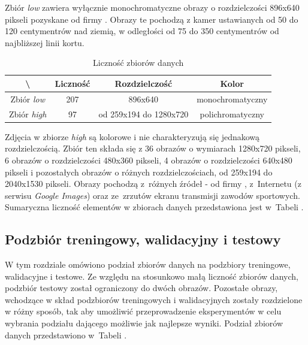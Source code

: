 Zbiór \textit{low} zawiera wyłącznie monochromatyczne obrazy o rozdzielczości 896x640 pikseli pozyskane od firmy \blue{}. Obrazy te pochodzą z kamer ustawianych od 50 do 120 centymentrów nad ziemią, w odległości od 75 do 350 centymentrów od najbliższej linii kortu.

\begin{table}[!h]
	\centering
	\caption{Liczność zbiorów danych}
	\vspace{6pt}
	{\footnotesize
		\begin{tabular}{|c|c|c|c|}
			\hline \textbackslash & Liczność & Rozdzielczość & Kolor \\
      \hline Zbiór \textit{low} & 207 & 896x640 & monochromatyczny \\
      \hline Zbiór \textit{high} & 97 & od 259x194 do 1280x720 & polichromatyczny \\
      \hline
    \end{tabular}
    \label{Tab:licznosc}
	}
	\vspace{0pt}
\end{table}

Zdjęcia w zbiorze \textit{high} są kolorowe i nie charakteryzują się jednakową rozdzielczością.
Zbiór ten składa się z 36 obrazów o wymiarach 1280x720 pikseli, 6 obrazów o rozdzielczości 480x360 pikseli, 4 obrazów o rozdzielczości 640x480 pikseli i pozostałych obrazów o różnych rozdzielczościach, od 259x194 do 2040x1530 pikseli. Obrazy pochodzą z~różnych źródeł - od firmy \blue{}, z~Internetu (z serwisu \textit{Google Images}) oraz ze~zrzutów ekranu transmisji zawodów sportowych. Sumaryczna liczność elementów w zbiorach danych przedstawiona jest w~Tabeli .

\subsection{Podzbiór treningowy, walidacyjny i testowy}
\label{sec:podzial}
W tym rozdziale omówiono podział zbiorów danych na podzbiory treningowe, walidacyjne i testowe.
Ze względu na stosunkowo małą liczność zbiorów danych, podzbiór testowy został ograniczony do dwóch obrazów.
Pozostałe obrazy, wchodzące w skład podzbiorów treningowych i walidacyjnych zostały rozdzielone w różny sposób, tak aby umożliwić przeprowadzenie eksperymentów w celu wybrania podziału dającego możliwie jak najlepsze wyniki.
Podział zbiorów danych przedstawiono w~Tabeli .

